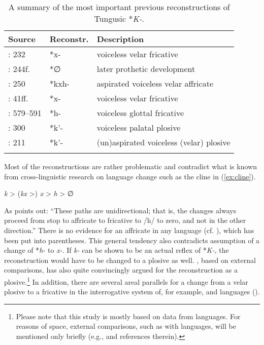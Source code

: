 \documentclass[output=paper,hidelinks]{langscibook}
\begin{document}
\begin{table}
\caption{A summary of the most important previous reconstructions of Tungusic *\textit{K-}.}
\label{tab:reconstructions}
 \begin{tabular}{lll} 
  \lsptoprule
  Source  &   Reconstr. &  Description\\
  \midrule
  \citealt{Schmidt1923}: 232 & *x- &  voiceless velar fricative\\
  \citealt{Shirokogoroff1931}: 244f.  &   *∅ &    later prothetic development\\
  \citealt{Cincius1949}: 250  &  *kxh-  &   aspirated voiceless velar affricate\\
  \citealt{Benzing1956}: 41ff.  &  *x-  &   voiceless velar fricative\\
  \citealt{Doerfer1973}: 579--591  &  *h-  &   voiceless glottal fricative\\
  \citealt{Cincius1975}: 300  &  *k’-  &   voiceless palatal plosive\\
  \citealt{Rozycki1993}: 211  &  *k’-  &   (un)aspirated voiceless (velar) plosive\\
  \lspbottomrule
 \end{tabular}
\end{table}

Most of the reconstructions are rather problematic and contradict what is known from cross-linguistic research on language change such as the cline in (\ref{ex:cline}).

\ea\label{ex:cline}
    \textit{k} > (\textit{kx} >) \textit{x} > \textit{h} > ∅
\z

\begin{sloppypar}
\noindent As \citet[29]{Bybee2015} points out: “These paths are unidirectional; that is, the changes always proceed from stop to affricate to fricative to /h/ to zero, and not in the other direction.” There is no evidence for an affricate in any  language (cf. \citealt[250]{Cincius1949}), which has been put into parentheses. This general tendency also contradicts  assumption of a change of  *\textit{h-} to  \textit{x-}. If  \textit{k-} can be shown to be an actual reflex of  *\textit{K-}, the reconstruction would have to be changed to a plosive as well. \citet{Rozycki1993}, based on external comparisons, has also quite convincingly argued for the reconstruction as a plosive.\footnote{Please note that this study is mostly based on data from  languages. For reasons of space, external comparisons, such as with  languages, will be mentioned only briefly (e.g., \citealt{Doerfer1985, Rozycki1993, Janhunen2017} and references therein).} In addition, there are several areal parallels for a change from a velar plosive to a fricative in the interrogative system of, for example,  and  languages ().
\end{sloppypar}
\end{document}
